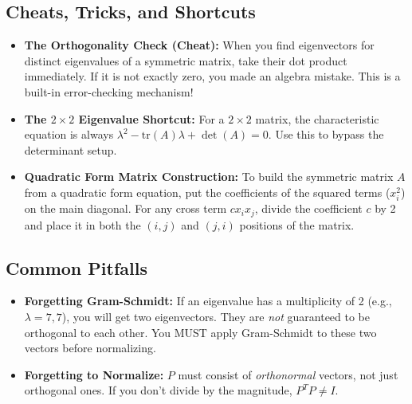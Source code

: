 \documentclass[11pt, letterpaper]{article}
\theoremstyle{definition}
\theoremstyle{remark}
\begin{document}
\subsection{Cheats, Tricks, and Shortcuts}
\begin{itemize}
    \item \textbf{The Orthogonality Check (Cheat):} When you find eigenvectors for distinct eigenvalues of a symmetric matrix, take their dot product immediately. If it is not exactly zero, you made an algebra mistake. This is a built-in error-checking mechanism!
    \item \textbf{The $2 \times 2$ Eigenvalue Shortcut:} For a $2 \times 2$ matrix, the characteristic equation is always $\lambda^2 - \text{tr}(A)\lambda + \det(A) = 0$. Use this to bypass the determinant setup.
    \item \textbf{Quadratic Form Matrix Construction:} To build the symmetric matrix $A$ from a quadratic form equation, put the coefficients of the squared terms ($x_i^2$) on the main diagonal. For any cross term $c x_i x_j$, divide the coefficient $c$ by 2 and place it in both the $(i,j)$ and $(j,i)$ positions of the matrix.
\end{itemize}

\subsection{Common Pitfalls}
\begin{itemize}
    \item \textbf{Forgetting Gram-Schmidt:} If an eigenvalue has a multiplicity of 2 (e.g., $\lambda = 7, 7$), you will get two eigenvectors. They are \textit{not} guaranteed to be orthogonal to each other. You MUST apply Gram-Schmidt to these two vectors before normalizing.
    \item \textbf{Forgetting to Normalize:} $P$ must consist of \textit{orthonormal} vectors, not just orthogonal ones. If you don't divide by the magnitude, $P^T P \neq I$.
\end{itemize}
\end{document}
